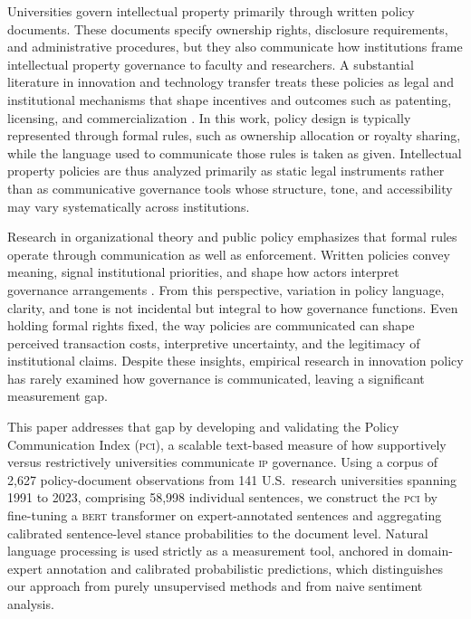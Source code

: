\documentclass[12pt]{article}
\newcommand{\PCI}{\textsc{pci}}
\newcommand{\IP}{\textsc{ip}}
\newcommand{\BERT}{\textsc{bert}}
\begin{document}
Universities govern intellectual property primarily through written policy documents.
These documents specify ownership rights, disclosure requirements, and administrative
procedures, but they also communicate how institutions frame intellectual property
governance to faculty and researchers.  A substantial literature in innovation and
technology transfer treats these policies as legal and institutional mechanisms that
shape incentives and outcomes such as patenting, licensing, and commercialization
\citep{Mowery2001, Mowery2004, Sampat2006, Lach2008, Ouellette2020}.  In this work,
policy design is typically represented through formal rules, such as ownership
allocation or royalty sharing, while the language used to communicate those rules is
taken as given.  Intellectual property policies are thus analyzed primarily as static
legal instruments rather than as communicative governance tools whose structure, tone,
and accessibility may vary systematically across institutions.

Research in organizational theory and public policy emphasizes that formal rules
operate through communication as well as enforcement.  Written policies convey meaning,
signal institutional priorities, and shape how actors interpret governance arrangements
\citep{Eisenberg2004, Putnam2009, Scott2013, Howlett2023}.  From this perspective,
variation in policy language, clarity, and tone is not incidental but integral to how
governance functions.  Even holding formal rights fixed, the way policies are communicated
can shape perceived transaction costs, interpretive uncertainty, and the legitimacy of
institutional claims.  Despite these insights, empirical research in innovation policy
has rarely examined how governance is communicated, leaving a significant measurement gap.

This paper addresses that gap by developing and validating the Policy Communication
Index (\PCI), a scalable text-based measure of how supportively versus restrictively
universities communicate \IP{} governance.  Using a corpus of 2,627 policy-document
observations from 141 U.S.\ research universities spanning 1991 to 2023, comprising
58,998 individual sentences, we construct the \PCI{} by fine-tuning a \BERT{}
transformer on expert-annotated sentences and aggregating calibrated sentence-level
stance probabilities to the document level.  Natural language processing is used
strictly as a measurement tool, anchored in domain-expert annotation and calibrated
probabilistic predictions, which distinguishes our approach from purely unsupervised
methods and from naive sentiment analysis.
\end{document}

